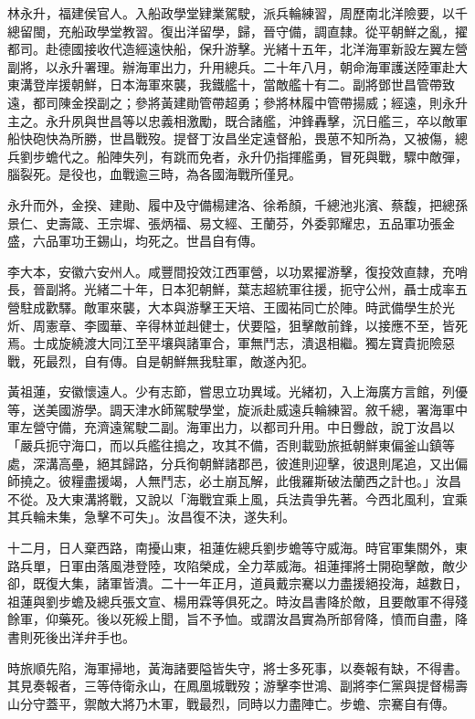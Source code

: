 \begin{pinyinscope}
林永升，福建侯官人。入船政學堂肄業駕駛，派兵輪練習，周歷南北洋險要，以千總留閩，充船政學堂教習。復出洋留學，歸，晉守備，調直隸。從平朝鮮之亂，擢都司。赴德國接收代造經遠快船，保升游擊。光緒十五年，北洋海軍新設左翼左營副將，以永升署理。辦海軍出力，升用總兵。二十年八月，朝命海軍護送陸軍赴大東溝登岸援朝鮮，日本海軍來襲，我鐵艦十，當敵艦十有二。副將鄧世昌管帶致遠，都司陳金揆副之；參將黃建勛管帶超勇；參將林履中管帶揚威；經遠，則永升主之。永升夙與世昌等以忠義相激勵，既合諸艦，沖鋒轟擊，沉日艦三，卒以敵軍船快砲快為所勝，世昌戰歿。提督丁汝昌坐定遠督船，畏葸不知所為，又被傷，總兵劉步蟾代之。船陣失列，有跳而免者，永升仍指揮艦勇，冒死與戰，驟中敵彈，腦裂死。是役也，血戰逾三時，為各國海戰所僅見。

永升而外，金揆、建勛、履中及守備楊建洛、徐希顏，千總池兆濱、蔡馥，把總孫景仁、史壽箴、王宗墀、張炳福、易文經、王蘭芬，外委郭耀忠，五品軍功張金盛，六品軍功王錫山，均死之。世昌自有傳。

李大本，安徽六安州人。咸豐間投效江西軍營，以功累擢游擊，復投效直隸，充哨長，晉副將。光緒二十年，日本犯朝鮮，葉志超統軍往援，扼守公州，聶士成率五營駐成歡驛。敵軍來襲，大本與游擊王天培、王國祐同亡於陣。時武備學生於光炘、周憲章、李國華、辛得林並赳健士，伏要隘，狙擊敵前鋒，以接應不至，皆死焉。士成旋繞渡大同江至平壤與諸軍合，軍無鬥志，潰退相繼。獨左寶貴扼險惡戰，死最烈，自有傳。自是朝鮮無我駐軍，敵遂內犯。

黃祖蓮，安徽懷遠人。少有志節，嘗思立功異域。光緒初，入上海廣方言館，列優等，送美國游學。調天津水師駕駛學堂，旋派赴威遠兵輪練習。敘千總，署海軍中軍左營守備，充濟遠駕駛二副。海軍出力，以都司升用。中日釁啟，說丁汝昌以「嚴兵扼守海口，而以兵艦往搗之，攻其不備，否則載勁旅抵朝鮮東偏釜山鎮等處，深溝高壘，絕其歸路，分兵徇朝鮮諸郡邑，彼進則迎擊，彼退則尾追，又出偏師撓之。彼糧盡援竭，人無鬥志，必土崩瓦解，此俄羅斯破法蘭西之計也。」汝昌不從。及大東溝將戰，又說以「海戰宜乘上風，兵法貴爭先著。今西北風利，宜乘其兵輪未集，急擊不可失」。汝昌復不決，遂失利。

十二月，日人棄西路，南擾山東，祖蓮佐總兵劉步蟾等守威海。時官軍集關外，東路兵單，日軍由落風港登陸，攻陷榮成，全力萃威海。祖蓮揮將士開砲擊敵，敵少卻，既復大集，諸軍皆潰。二十一年正月，道員戴宗騫以力盡援絕投海，越數日，祖蓮與劉步蟾及總兵張文宣、楊用霖等俱死之。時汝昌書降於敵，且要敵軍不得殘餘軍，仰藥死。後以死綏上聞，旨不予恤。或謂汝昌實為所部脅降，憤而自盡，降書則死後出洋弁手也。

時旅順先陷，海軍掃地，黃海諸要隘皆失守，將士多死事，以奏報有缺，不得書。其見奏報者，三等侍衛永山，在鳳凰城戰歿；游擊李世鴻、副將李仁黨與提督楊壽山分守蓋平，禦敵大將乃木軍，戰最烈，同時以力盡陣亡。步蟾、宗騫自有傳。


\end{pinyinscope}